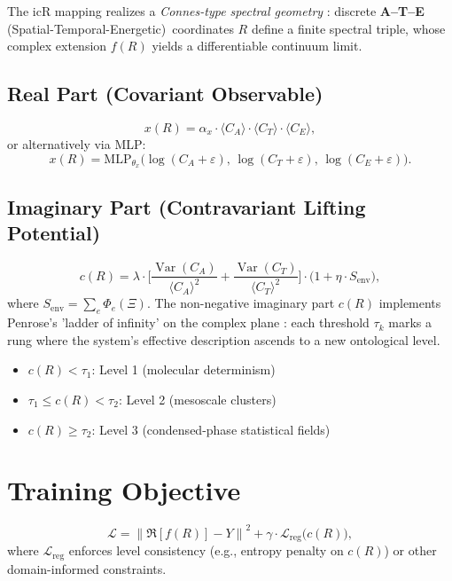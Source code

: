 \documentclass[11pt]{article}
\DeclareMathOperator{\Var}{Var}
\DeclareMathOperator{\logE}{log}
\newcommand{\RePart}{\Re}
\newcommand{\eps}{\varepsilon}
\newcommand{\norm}[1]{\left\|#1\right\|}
\newcommand{\avg}[1]{\langle #1 \rangle}
\newcommand{\ATE}{\textbf{A--T--E} (Spatial-Temporal-Energetic)}
\begin{document}
The icR mapping realizes a \emph{Connes-type spectral geometry} \cite{connes1994}: discrete \ATE\ coordinates $R$ define a finite spectral triple, whose complex extension $f(R)$ yields a differentiable continuum limit.

\subsection{Real Part (Covariant Observable)}
\label{subsec:real-part}
\begin{equation}
    x(R) = \alpha_x \cdot \avg{C_A} \cdot \avg{C_T} \cdot \avg{C_E},
    \label{eq:x-r-product-form}
\end{equation}
or alternatively via MLP:
\begin{equation}
    x(R) = \mathrm{MLP}_{\theta_x}\big( \logE(C_A+\eps),\, \logE(C_T+\eps),\, \logE(C_E+\eps) \big).
    \label{eq:x-r-mlp-form}
\end{equation}

\subsection{Imaginary Part (Contravariant Lifting Potential)}
\label{subsec:imag-part}
\begin{equation}
    c(R) = \lambda \cdot \Bigg[ \frac{\Var(C_A)}{\avg{C_A}^2} + \frac{\Var(C_T)}{\avg{C_T}^2} \Bigg] \cdot \big(1 + \eta \cdot S_{\mathrm{env}} \big),
    \label{eq:c-r-lifting}
\end{equation}
where $S_{\mathrm{env}} = \sum_e \Phi_e(\Xi)$. The non-negative imaginary part $c(R)$ implements Penrose's 'ladder of infinity' on the complex plane \cite{penrose2004}: each threshold $\tau_k$ marks a rung where the system's effective description ascends to a new ontological level.
\begin{itemize}[leftmargin=*, nosep]
    \item $c(R) < \tau_1$: Level 1 (molecular determinism)
    \item $\tau_1 \leq c(R) < \tau_2$: Level 2 (mesoscale clusters)
    \item $c(R) \geq \tau_2$: Level 3 (condensed-phase statistical fields)
\end{itemize}

\section{Training Objective}
\label{sec:training-objective}
\begin{equation}
    \mathcal{L} = \norm{ \RePart[f(R)] - Y }^2 + \gamma \cdot \mathcal{L}_{\mathrm{reg}}\big(c(R)\big),
    \label{eq:training-loss}
\end{equation}
where $\mathcal{L}_{\mathrm{reg}}$ enforces level consistency (e.g., entropy penalty on $c(R)$) or other domain-informed constraints.
\end{document}
